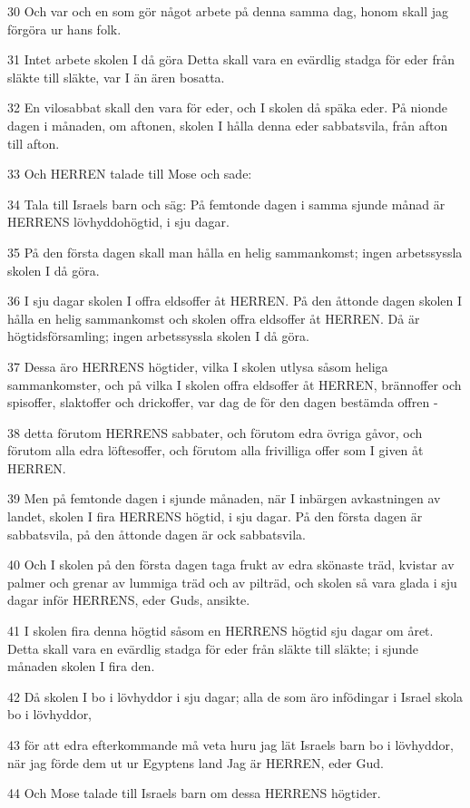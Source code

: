\par 30 Och var och en som gör något arbete på denna samma dag, honom skall jag förgöra ur hans folk.
\par 31 Intet arbete skolen I då göra Detta skall vara en evärdlig stadga för eder från släkte till släkte, var I än ären bosatta.
\par 32 En vilosabbat skall den vara för eder, och I skolen då späka eder. På nionde dagen i månaden, om aftonen, skolen I hålla denna eder sabbatsvila, från afton till afton.
\par 33 Och HERREN talade till Mose och sade:
\par 34 Tala till Israels barn och säg: På femtonde dagen i samma sjunde månad är HERRENS lövhyddohögtid, i sju dagar.
\par 35 På den första dagen skall man hålla en helig sammankomst; ingen arbetssyssla skolen I då göra.
\par 36 I sju dagar skolen I offra eldsoffer åt HERREN. På den åttonde dagen skolen I hålla en helig sammankomst och skolen offra eldsoffer åt HERREN. Då är högtidsförsamling; ingen arbetssyssla skolen I då göra.
\par 37 Dessa äro HERRENS högtider, vilka I skolen utlysa såsom heliga sammankomster, och på vilka I skolen offra eldsoffer åt HERREN, brännoffer och spisoffer, slaktoffer och drickoffer, var dag de för den dagen bestämda offren -
\par 38 detta förutom HERRENS sabbater, och förutom edra övriga gåvor, och förutom alla edra löftesoffer, och förutom alla frivilliga offer som I given åt HERREN.
\par 39 Men på femtonde dagen i sjunde månaden, när I inbärgen avkastningen av landet, skolen I fira HERRENS högtid, i sju dagar. På den första dagen är sabbatsvila, på den åttonde dagen är ock sabbatsvila.
\par 40 Och I skolen på den första dagen taga frukt av edra skönaste träd, kvistar av palmer och grenar av lummiga träd och av pilträd, och skolen så vara glada i sju dagar inför HERRENS, eder Guds, ansikte.
\par 41 I skolen fira denna högtid såsom en HERRENS högtid sju dagar om året. Detta skall vara en evärdlig stadga för eder från släkte till släkte; i sjunde månaden skolen I fira den.
\par 42 Då skolen I bo i lövhyddor i sju dagar; alla de som äro infödingar i Israel skola bo i lövhyddor,
\par 43 för att edra efterkommande må veta huru jag lät Israels barn bo i lövhyddor, när jag förde dem ut ur Egyptens land Jag är HERREN, eder Gud.
\par 44 Och Mose talade till Israels barn om dessa HERRENS högtider.

